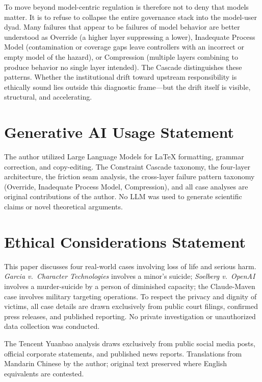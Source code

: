 \documentclass[11pt]{article}
\begin{document}
To move beyond model-centric regulation is therefore not to deny that models matter. It is to refuse to collapse the entire governance stack into the model-user dyad. Many failures that appear to be failures of model behavior are better understood as Override (a higher layer suppressing a lower), Inadequate Process Model (contamination or coverage gaps leave controllers with an incorrect or empty model of the hazard), or Compression (multiple layers combining to produce behavior no single layer intended). The Cascade distinguishes these patterns. Whether the institutional drift toward upstream responsibility is ethically sound lies outside this diagnostic frame---but the drift itself is visible, structural, and accelerating.

\section*{Generative AI Usage Statement}

The author utilized Large Language Models for \LaTeX{} formatting, grammar correction, and copy-editing. The Constraint Cascade taxonomy, the four-layer architecture, the friction seam analysis, the cross-layer failure pattern taxonomy (Override, Inadequate Process Model, Compression), and all case analyses are original contributions of the author. No LLM was used to generate scientific claims or novel theoretical arguments.

\section*{Ethical Considerations Statement}

This paper discusses four real-world cases involving loss of life and serious harm. \emph{Garcia v.\ Character Technologies} involves a minor's suicide; \emph{Soelberg v.\ OpenAI} involves a murder-suicide by a person of diminished capacity; the Claude-Maven case involves military targeting operations. To respect the privacy and dignity of victims, all case details are drawn exclusively from public court filings, confirmed press releases, and published reporting. No private investigation or unauthorized data collection was conducted.

The Tencent Yuanbao analysis draws exclusively from public social media posts, official corporate statements, and published news reports. Translations from Mandarin Chinese by the author; original text preserved where English equivalents are contested.
\end{document}
